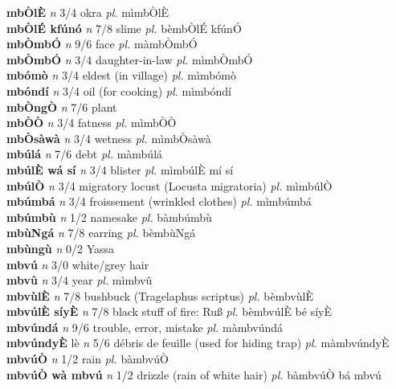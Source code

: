 \documentclass{article}
\newlength\cus
\begin{document}
{\bf mbÒlÈ}  {\it n} 3/4 okra {\it pl.} mìmbÒlÈ         \\ 
{\bf mbÒlÉ kfúnó}  {\it n} 7/8 slime {\it pl.} bèmbÒlÉ kfúnÓ         \\ 
{\bf mbÒmbÓ}  {\it n} 9/6 face {\it pl.} màmbÒmbÓ         \\ 
{\bf mbÒmbÓ}  {\it n} 3/4 daughter-in-law {\it pl.} mìmbÒmbÓ         \\ 
{\bf mbómò}  {\it n} 3/4 eldest (in village) {\it pl.} mìmbómò         \\ 
{\bf mbóndí}  {\it n} 3/4 oil (for cooking) {\it pl.} mìmbóndí         \\ 
{\bf mbÒngÒ}  {\it n} 7/6 plant         \\ 
{\bf mbÒÒ}  {\it n} 3/4 fatness {\it pl.} mìmbÒÒ         \\ 
{\bf mbÒsàwà}  {\it n} 3/4 wetness {\it pl.} mìmbÒsàwà         \\ 
{\bf mbúlá}  {\it n} 7/6 debt {\it pl.} màmbúlá         \\ 
{\bf mbúlÈ wá sí}  {\it n} 3/4 blister {\it pl.} mìmbúlÈ mí sí         \\ 
{\bf mbúlÒ}  {\it n} 3/4 migratory locust (Locusta migratoria) {\it pl.} mìmbúlÒ         \\ 
{\bf mbúmbá}  {\it n} 3/4 froissement (wrinkled clothes) {\it pl.} mìmbúmbá         \\ 
{\bf mbúmbù}  {\it n} 1/2 namesake {\it pl.} bàmbúmbù         \\ 
{\bf mbùNgá}  {\it n} 7/8 earring {\it pl.} bèmbùNgá         \\ 
{\bf mbùngù}  {\it n} 0/2 Yassa         \\ 
{\bf mbvú}  {\it n} 3/0 white/grey hair         \\ 
{\bf mbvû}  {\it n} 3/4 year {\it pl.} mìmbvû         \\ 
{\bf mbvùlÈ}  {\it n} 7/8 bushbuck (Tragelaphus scriptus) {\it pl.} bèmbvùlÈ         \\ 
{\bf mbvúlÈ síyÈ}  {\it n} 7/8 black stuff of fire: Ruß {\it pl.} bèmbvúlÈ bé síyÈ         \\ 
{\bf mbvúndá}  {\it n} 9/6 trouble, error, mistake {\it pl.} màmbvúndá         \\ 
{\bf mbvúndyÈ} lè {\it n} 5/6 débris de feuille (used for hiding trap) {\it pl.} màmbvúndyÈ         \\ 
{\bf mbvúÒ}  {\it n} 1/2 rain {\it pl.} bàmbvúÒ         \\ 
{\bf mbvúÒ wà mbvú}  {\it  n} 1/2 drizzle (rain of white hair) {\it pl.} bàmbvúÒ bá mbvú         \\ 
\end{document}
